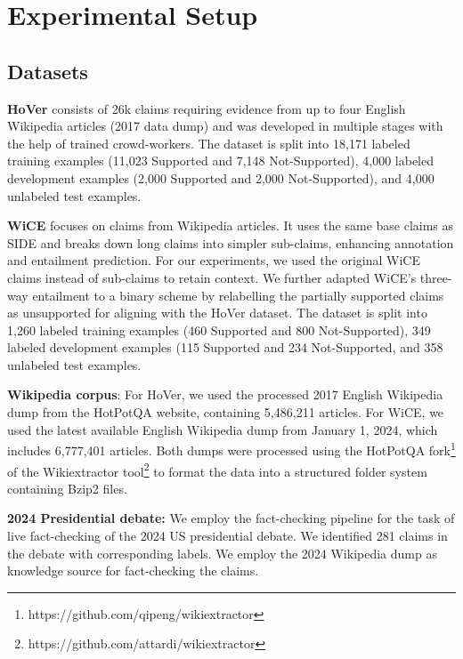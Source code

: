 \section{Experimental Setup}
\label{experiments}


\subsection{Datasets}

\noindent \textbf{HoVer}\cite{jiang2020hover} consists of 26k claims requiring evidence from up to four English Wikipedia articles (2017 data dump) and was developed in multiple stages with the help of trained crowd-workers. The dataset is split into 18,171 labeled training examples (11,023 Supported and 7,148 Not-Supported), 4,000 labeled development examples (2,000 Supported and 2,000 Not-Supported), and 4,000 unlabeled test examples. 

\noindent \textbf{WiCE}\cite{kamoi2023wice} focuses on claims from Wikipedia articles. It uses the same base claims as SIDE \cite{petroni2022improving} and breaks down long claims into simpler sub-claims, enhancing annotation and entailment prediction. For our experiments, we used the original WiCE claims instead of sub-claims to retain context. We further adapted WiCE's three-way entailment to a binary scheme by relabelling the partially supported claims as unsupported for aligning with the HoVer dataset. The dataset is split into 1,260 labeled training examples (460 Supported and 800 Not-Supported), 349 labeled development examples (115 Supported and 234 Not-Supported, and 358 unlabeled test examples.


\noindent \textbf{Wikipedia corpus}: For HoVer, we used the processed 2017 English Wikipedia dump from the HotPotQA website, containing 5,486,211 articles. For WiCE, we used the latest available English Wikipedia dump from January 1, 2024, which includes 6,777,401 articles. Both dumps were processed using the HotPotQA fork\footnote{https://github.com/qipeng/wikiextractor} of the Wikiextractor tool\footnote{https://github.com/attardi/wikiextractor} to format the data into a structured folder system containing Bzip2 files.

\noindent \textbf{2024 Presidential debate:} We employ the fact-checking pipeline for the task of live fact-checking of the 2024 US presidential debate. We identified 281 claims in the debate with corresponding labels. We employ the 2024 Wikipedia dump as knowledge source for fact-checking the claims.


